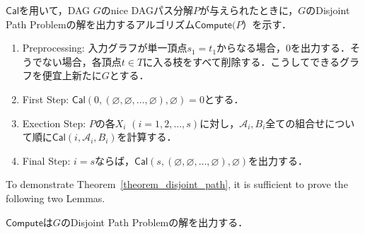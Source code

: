 $\mathsf{Cal}$を用いて，DAG $G$のnice DAGパス分解$P$が与えられたときに，$G$のDisjoint Path Problemの解を出力するアルゴリズム$\mathsf{Compute}(P）$を示す．


\begin{enumerate}
    \item Preprocessing: 入力グラフが単一頂点$s_1=t_1$からなる場合，0を出力する．そうでない場合，各頂点$t \in T$に入る枝をすべて削除する．こうしてできるグラフを便宜上新たに$G$とする．
    \item First Step: $\mathsf{Cal}(0, (\varnothing, \varnothing, \dots, \varnothing), \varnothing) = 0$とする．
    \item Exection Step: $P$の各$X_i$ $(i=1, 2, \dots, s)$に対し，$\mathscr{A}_i, B_i$全ての組合せについて順に$\mathsf{Cal}(i, \mathscr{A}_i, B_i)$を計算する．
    \item Final Step: $i = s$ならば，$\mathsf{Cal}(s, (\varnothing, \varnothing, \dots, \varnothing), \varnothing)$を出力する．
\end{enumerate}

To demonstrate Theorem~\ref{theorem_disjoint_path}, it is sufficient to prove the following two Lemmas.

\begin{lemma}\label{dpp}
    $\mathsf{Compute}$は$G$のDisjoint Path Problemの解を出力する．
\end{lemma}

